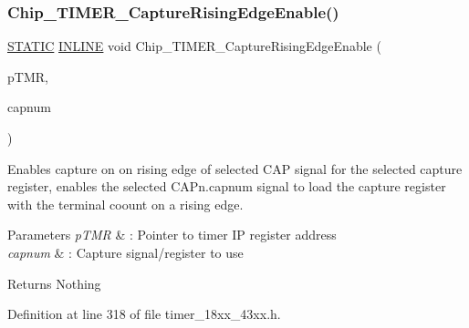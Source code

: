 \subsubsection{\texorpdfstring{Chip\+\_\+\+T\+I\+M\+E\+R\+\_\+\+Capture\+Rising\+Edge\+Enable()}{Chip\_TIMER\_CaptureRisingEdgeEnable()}}
{\footnotesize\ttfamily \hyperlink{group___l_p_c___types___public___macros_ga10b2d890d871e1489bb02b7e70d9bdfb}{S\+T\+A\+T\+IC} \hyperlink{spifi__18xx__43xx_8h_a2eb6f9e0395b47b8d5e3eeae4fe0c116}{I\+N\+L\+I\+NE} void Chip\+\_\+\+T\+I\+M\+E\+R\+\_\+\+Capture\+Rising\+Edge\+Enable (\begin{DoxyParamCaption}\item[{\hyperlink{struct_l_p_c___t_i_m_e_r___t}{L\+P\+C\+\_\+\+T\+I\+M\+E\+R\+\_\+T} $\ast$}]{p\+T\+MR,  }\item[{int8\+\_\+t}]{capnum }\end{DoxyParamCaption})}



Enables capture on on rising edge of selected C\+AP signal for the selected capture register, enables the selected C\+A\+Pn.\+capnum signal to load the capture register with the terminal coount on a rising edge. 


\begin{DoxyParams}{Parameters}
{\em p\+T\+MR} & \+: Pointer to timer IP register address \\
\hline
{\em capnum} & \+: Capture signal/register to use \\
\hline
\end{DoxyParams}
\begin{DoxyReturn}{Returns}
Nothing 
\end{DoxyReturn}


Definition at line 318 of file timer\+\_\+18xx\+\_\+43xx.\+h.

\mbox{\label{group___t_i_m_e_r__18_x_x__43_x_x_ga0aebc9314c86b4e9a67e2d08bab38e24}} 
